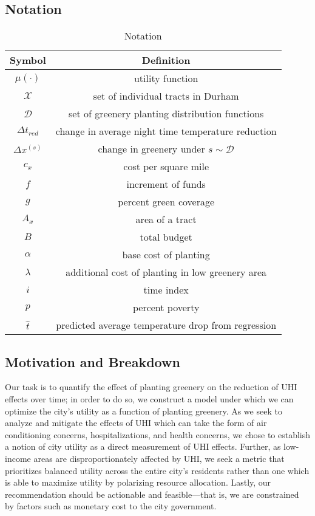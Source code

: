 \documentclass[11pt]{article}
\begin{document}
\subsection{Notation}
\begin{table}[H]
    \centering
    \caption{Notation}
    \label{tab:notation}
    \begin{tabular}{cc} \toprule
        {Symbol} & {Definition} \\ \midrule
        $\mu(\cdot)$  & utility function   \\ \midrule
        $\mathcal{X}$ & set of individual tracts in Durham \\ \midrule
        $\mathcal{D}$ & set of greenery planting distribution functions \\ \midrule
        $\Delta t_{red}$  & change in average night time temperature reduction  \\ \midrule
        $\Delta x^{(s)}$ & change in greenery under $s \sim \mathcal{D}$ \\ \midrule
        $c_x$ & cost per square mile \\ \midrule
        $f$ & increment of funds \\ \midrule
        $g$ & percent green coverage \\ \midrule
        $A_x$ & area of a tract \\ \midrule
        $B$ & total budget \\ \midrule
        $\alpha$ & base cost of planting \\ \midrule
        $\lambda$ & additional cost of planting in low greenery area \\ \midrule
        $i$ & time index \\ \midrule
        $p$  & percent poverty \\ \midrule
        $\hat{t}$ & predicted average temperature drop from regression \\ \bottomrule

    \end{tabular}
\end{table}

\subsection{Motivation and Breakdown}
Our task is to quantify the effect of planting greenery on the reduction of UHI effects over time; in order to do so, we construct a model under which we can optimize the city's utility as a function of planting greenery. As we seek to analyze and mitigate the effects of UHI which can take the form of air conditioning concerns, hospitalizations, and health concerns, we chose to establish a notion of city utility as a direct measurement of UHI effects. Further, as low-income areas are disproportionately affected by UHI, we seek a metric that prioritizes balanced utility across the entire city's residents rather than one which is able to maximize utility by polarizing resource allocation. Lastly, our recommendation should be actionable and feasible---that is, we are constrained by factors such as monetary cost to the city government.
\end{document}
